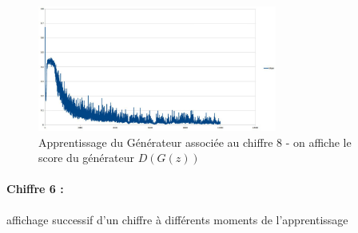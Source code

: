 \begin{figure}[H]
\begin{center}
\includegraphics[width=0.7\textwidth]{images/18_01_12-GAN/courbe.png}\caption{Apprentissage du Générateur associée au chiffre 8 - on affiche le score du générateur $D(G(z))$}
\end{center}
\end{figure}


\paragraph{Chiffre 6 : } affichage successif d'un chiffre à différents moments de l'apprentissage

